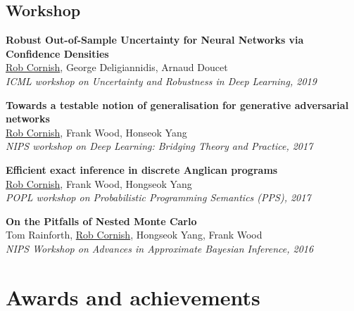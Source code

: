 \documentclass[12pt,a4paper]{article}
\begin{document}
\subsection*{Workshop}

\textbf{Robust Out-of-Sample Uncertainty for Neural Networks via Confidence Densities} \\
\underline{Rob Cornish}, George Deligiannidis, Arnaud Doucet \\
\textit{ICML workshop on Uncertainty and Robustness in Deep Learning, 2019}

\noindent
\textbf{Towards a testable notion of generalisation for generative adversarial networks} \\
\underline{Rob Cornish}, Frank Wood, Honseok Yang \\
\textit{NIPS workshop on Deep Learning: Bridging Theory and Practice, 2017}

\newpage
\noindent
\textbf{Efficient exact inference in discrete Anglican programs} \\
\underline{Rob Cornish}, Frank Wood, Hongseok Yang \\
\textit{POPL workshop on Probabilistic Programming Semantics (PPS), 2017}

\noindent
\textbf{On the Pitfalls of Nested Monte Carlo} \\
Tom Rainforth, \underline{Rob Cornish}, Hongseok Yang, Frank Wood \\
\textit{NIPS Workshop on Advances in Approximate Bayesian Inference, 2016}

\section*{Awards and achievements}
\end{document}
